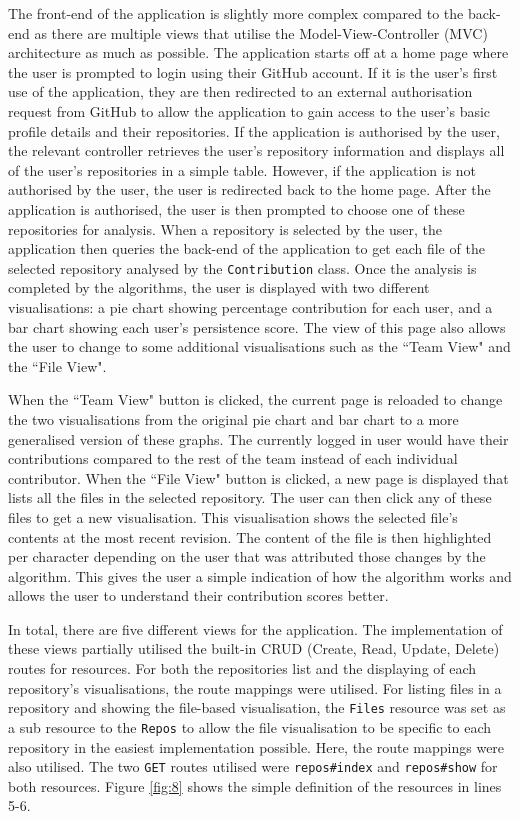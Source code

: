 The front-end of the application is slightly more complex compared to the back-end as there are multiple views that utilise the Model-View-Controller (MVC) architecture as much as possible. The application starts off at a home page where the user is prompted to login using their GitHub account. If it is the user's first use of the application, they are then redirected to an external authorisation request from GitHub to allow the application to gain access to the user's basic profile details and their repositories. If the application is authorised by the user, the relevant controller retrieves the user's repository information and displays all of the user's repositories in a simple table. However, if the application is not authorised by the user, the user is redirected back to the home page. After the application is authorised, the user is then prompted to choose one of these repositories for analysis. When a repository is selected by the user, the application then queries the back-end of the application to get each file of the selected repository analysed by the \texttt{Contribution} class. Once the analysis is completed by the algorithms, the user is displayed with two different visualisations: a pie chart showing percentage contribution for each user, and a bar chart showing each user's persistence score. The view of this page also allows the user to change to some additional visualisations such as the ``Team View" and the ``File View".

When the ``Team View" button is clicked, the current page is reloaded to change the two visualisations from the original pie chart and bar chart to a more generalised version of these graphs. The currently logged in user would have their contributions compared to the rest of the team instead of each individual contributor. When the ``File View" button is clicked, a new page is displayed that lists all the files in the selected repository. The user can then click any of these files to get a new visualisation. This visualisation shows the selected file's contents at the most recent revision. The content of the file is then highlighted per character depending on the user that was attributed those changes by the algorithm. This gives the user a simple indication of how the algorithm works and allows the user to understand their contribution scores better.

In total, there are five different views for the application. The implementation of these views partially utilised the built-in CRUD (Create, Read, Update, Delete) routes for resources. For both the repositories list and the displaying of each repository's visualisations, the  route mappings were utilised. For listing files in a repository and showing the file-based visualisation, the \texttt{Files} resource was set as a sub resource to the \texttt{Repos} to allow the file visualisation to be specific to each repository in the easiest implementation possible. Here, the  route mappings were also utilised. The two \texttt{GET} routes utilised were \texttt{repos\#index} and \texttt{repos\#show} for both resources. Figure \ref{fig:8} shows the simple definition of the resources in lines 5-6.

